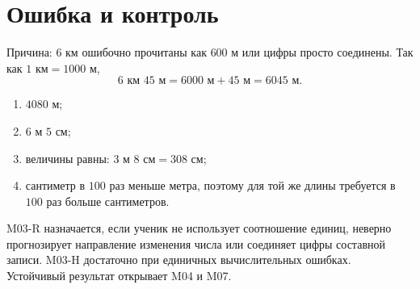 \section{Ошибка и контроль}

\begin{warningbox}[Исправление]
  Причина: $6$ км ошибочно прочитаны как $600$ м или цифры просто
  соединены. Так как $1\text{ км}=1000\text{ м}$,
  \[
    6\text{ км }45\text{ м}=6000\text{ м}+45\text{ м}=6045\text{ м}.
  \]
\end{warningbox}

\begin{checkpointbox}[Ответы]
  \begin{enumerate}[label=\textbf{\arabic*.}]
    \item $4080$ м;
    \item $6\text{ м }5\text{ см}$;
    \item величины равны: $3\text{ м }8\text{ см}=308\text{ см}$;
    \item сантиметр в $100$ раз меньше метра, поэтому для той же длины
      требуется в $100$ раз больше сантиметров.
  \end{enumerate}
\end{checkpointbox}

\begin{teacherbox}
  M03-R назначается, если ученик не использует соотношение единиц, неверно
  прогнозирует направление изменения числа или соединяет цифры составной
  записи. M03-H достаточно при единичных вычислительных ошибках. Устойчивый
  результат открывает M04 и M07.
\end{teacherbox}
